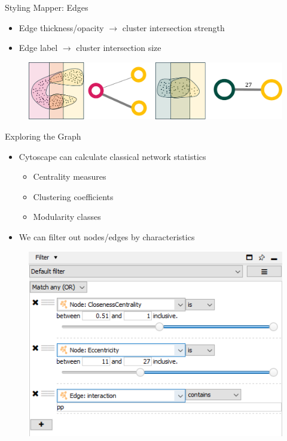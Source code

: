 \documentclass{beamer}
\begin{document}
\begin{frame}{Styling Mapper: Edges}
  \begin{itemize}
    \item Edge thickness/opacity $\to$ cluster intersection strength
    \item Edge label $\to$ cluster intersection size
  \end{itemize}
  \begin{figure}
    \begin{center}
      \includegraphics[width=1.05\textwidth]{edgestyling.png}
    \end{center}
  \end{figure}
\end{frame}

\begin{frame}{Exploring the Graph}
  \begin{itemize}
    \item Cytoscape can calculate classical network statistics
    \begin{itemize}
      \item Centrality measures
      \item Clustering coefficients
      \item Modularity classes
    \end{itemize}
    \item We can filter out nodes/edges by characteristics
  \end{itemize}
  \begin{figure}
    \begin{center}
      \includegraphics[width=.65\textwidth]{cytofilter.png}
    \end{center}
  \end{figure}
\end{frame}
\end{document}
